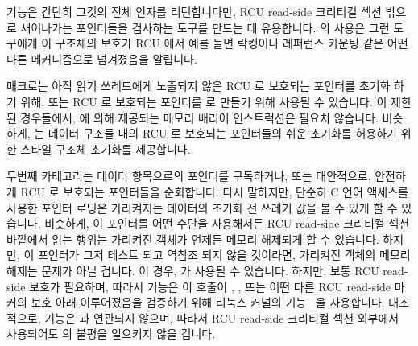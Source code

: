  기능은 간단히 그것의 전체 인자를 리턴합니다만, RCU
read-side 크리티컬 섹션 밖으로 새어나가는 포인터들을 검사하는 도구를 만드는 데
유용합니다.
 의 사용은 그런 도구에게 이 구조체의 보호가 RCU 에서
예를 들면 락킹이나 레퍼런스 카운팅 같은 어떤 다른 메커니즘으로 넘겨졌음을
알립니다.

 매크로는 아직 읽기 쓰레드에게 노출되지 않은 RCU 로
보호되는 포인터를 초기화 하기 위해, 또는 RCU 로 보호되는 포인터를  로
만들기 위해 사용될 수 있습니다.
이 제한된 경우들에서,  에 의해 제공되는 메모리 배리어
인스트럭션은 필요치 않습니다.
비슷하게,  는 데이터 구조들 내의 RCU 로 보호되는
포인터들의 쉬운 초기화를 허용하기 위한 \GCC 스타일 구조체 초기화를 제공합니다.

두번째 카테고리는 데이터 항목으로의 포인터를 구독하거나, 또는 대안적으로,
안전하게 RCU 로 보호되는 포인터들을 순회합니다.
다시 말하지만, 단순히 C 언어 액세스를 사용한 포인터 로딩은 가리켜지는 데이터의
초기화 전 쓰레기 값을 볼 수 있게 할 수 있습니다.
비슷하게, 이 포인터를 어떤 수단을 사용해서든 RCU read-side 크리티컬 섹션
바깥에서 읽는 행위는 가리켜진 객체가 언제든 메모리 해제되게 할 수 있습니다.
하지만, 이 포인터가 그저 테스트 되고 역참조 되지 않을 것이라면, 가리켜진 객체의
메모리 해제는 문제가 아닐 겁니다.
이 경우,  가 사용될 수 있습니다.
하지만, 보통 RCU read-side 보호가 필요하며, 따라서 
기능은 이  호출이 ,
, 또는 어떤 다른 RCU read-side 마커의 보호 아래
이루어졌음을 검증하기 위해 리눅스 커널의 
기능~\cite{JonathanCorbet2006lockdep} 을 사용합니다.
대조적으로,  기능은  과 연관되지 않으며,
따라서 RCU read-side 크리티컬 섹션 외부에서 사용되어도  의 불평을
일으키지 않을 겁니다.

